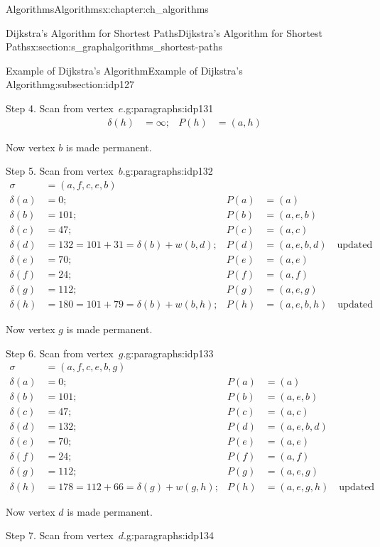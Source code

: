 \documentclass[oneside,10pt,]{book}
\numberwithin{equation}{section}
\newcommand{\amp}{&}
\begin{document}
\begin{chapterptx}{Algorithms}{}{Algorithms}{}{}{x:chapter:ch_algorithms}
\begin{sectionptx}{Dijkstra's Algorithm for Shortest Paths}{}{Dijkstra's Algorithm for Shortest Paths}{}{}{x:section:s_graphalgorithms_shortest-paths}
\begin{subsectionptx}{Example of Dijkstra's Algorithm}{}{Example of Dijkstra's Algorithm}{}{}{g:subsection:idp127}
\begin{paragraphs}{Step 4.  Scan from vertex~\(e\).}{g:paragraphs:idp131}
\begin{align*}
\delta(h)\amp=\infty; \amp P(h)\amp=(a,h)
\end{align*}
%
\par
Now vertex \(b\) is made permanent.%
\end{paragraphs}%
\begin{paragraphs}{Step 5.  Scan from vertex~\(b\).}{g:paragraphs:idp132}%
%
\begin{align*}
\sigma\amp=(a,f,c,e,b)\\
\delta(a)\amp=0; \amp P(a)\amp=(a)\\
\delta(b)\amp=101; \amp P(b)\amp=(a,e,b)\\
\delta(c)\amp=47; \amp P(c)\amp=(a,c)\\
\delta(d)\amp= 132 = 101+ 31= \delta(b)+w(b,d); \amp P(d)\amp=(a,e,b,d)\quad\text{updated} \\
\delta(e)\amp= 70; \amp P(e)\amp=(a,e)\\
\delta(f)\amp= 24; \amp P(f)\amp=(a,f)\\
\delta(g)\amp=112; \amp P(g)\amp=(a,e,g)\\
\delta(h)\amp=180 = 101+79=\delta(b)+w(b,h); \amp P(h)\amp=(a,e,b,h)\quad\text{updated} 
\end{align*}
%
\par
Now vertex \(g\) is made permanent.%
\end{paragraphs}%
\begin{paragraphs}{Step 6.  Scan from vertex~\(g\).}{g:paragraphs:idp133}%
%
\begin{align*}
\sigma\amp=(a,f,c,e,b,g)\\
\delta(a)\amp=0; \amp P(a)\amp=(a)\\
\delta(b)\amp=101; \amp P(b)\amp=(a,e,b)\\
\delta(c)\amp=47; \amp P(c)\amp=(a,c)\\
\delta(d)\amp= 132; \amp P(d)\amp=(a,e,b,d)\\
\delta(e)\amp=70; \amp P(e)\amp=(a,e)\\
\delta(f)\amp=24; \amp P(f)\amp=(a,f)\\
\delta(g)\amp=112; \amp P(g)\amp=(a,e,g)\\
\delta(h)\amp=178 = 112+66=\delta(g)+w(g,h); \amp P(h)\amp=(a,e,g,h)\quad\text{updated}
\end{align*}
%
\par
Now vertex \(d\) is made permanent.%
\end{paragraphs}%
\begin{paragraphs}{Step 7.  Scan from vertex~\(d\).}{g:paragraphs:idp134}%
%
\begin{align*}

\end{align*}
\end{paragraphs}
\end{subsectionptx}
\end{sectionptx}
\end{chapterptx}
\end{document}
